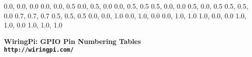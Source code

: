 \documentclass[12pt,a4paper]{article}
\begin{document}
\begin{sffamily}
\definecolor{rtb-black}{rgb}  {0.0, 0.0, 0.0}
\definecolor{rtb-navy}{rgb}   {0.0, 0.0, 0.5}
\definecolor{rtb-green}{rgb}  {0.0, 0.5, 0.0}
\definecolor{rtb-teal}{rgb}   {0.0, 0.5, 0.5}
\definecolor{rtb-maroon}{rgb} {0.5, 0.0, 0.0}
\definecolor{rtb-purple}{rgb} {0.5, 0.0, 0.5}
\definecolor{rtb-olive}{rgb}  {0.5, 0.5, 0.0}
\definecolor{rtb-silver}{rgb} {0.7, 0.7, 0.7}
\definecolor{rtb-grey}{rgb}   {0.5, 0.5, 0.5}
\definecolor{rtb-blue}{rgb}   {0.0, 0.0, 1.0}
\definecolor{rtb-lime}{rgb}   {0.0, 1.0, 0.0}
\definecolor{rtb-aqua}{rgb}   {0.0, 1.0, 1.0}
\definecolor{rtb-red}{rgb}    {1.0, 0.0, 0.0}
\definecolor{rtb-yellow}{rgb} {1.0, 1.0, 0.0}
\definecolor{rtb-white}{rgb}  {1.0, 1.0, 1.0}

\begin{center}
\bfseries{WiringPi: GPIO Pin Numbering Tables}\\
\tt{http://wiringpi.com/}
\end{center}


\end{sffamily}
\end{document}
